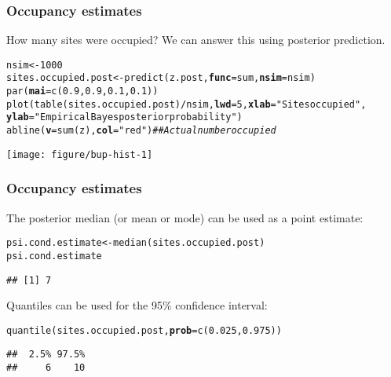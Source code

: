 \documentclass[color=usenames,dvipsnames,handout]{beamer}\usepackage[]{graphicx}\usepackage[]{xcolor}
\makeatletter
\newcommand{\hlnum}[1]{\textcolor[rgb]{0.69,0.494,0}{#1}}%
\newcommand{\hlsng}[1]{\textcolor[rgb]{0.749,0.012,0.012}{#1}}%
\newcommand{\hlcom}[1]{\textcolor[rgb]{0.514,0.506,0.514}{\textit{#1}}}%
\newcommand{\hlopt}[1]{\textcolor[rgb]{0,0,0}{#1}}%
\newcommand{\hldef}[1]{\textcolor[rgb]{0,0,0}{#1}}%
\newcommand{\hlkwb}[1]{\textcolor[rgb]{0,0.341,0.682}{#1}}%
\newcommand{\hlkwc}[1]{\textcolor[rgb]{0,0,0}{\textbf{#1}}}%
\newcommand{\hlkwd}[1]{\textcolor[rgb]{0.004,0.004,0.506}{#1}}%
\newenvironment{kframe}{%
 \def\at@end@of@kframe{}%
 \ifinner\ifhmode%
  \def\at@end@of@kframe{\end{minipage}}%
  \begin{minipage}{\columnwidth}%
 \fi\fi%
 \def\FrameCommand##1{\hskip\@totalleftmargin \hskip-\fboxsep
 \colorbox{shadecolor}{##1}\hskip-\fboxsep
     \hskip-\linewidth \hskip-\@totalleftmargin \hskip\columnwidth}%
 \MakeFramed {\advance\hsize-\width
   \@totalleftmargin\z@ \linewidth\hsize
   \@setminipage}}%
 {\par\unskip\endMakeFramed%
 \at@end@of@kframe}
\newenvironment{knitrout}{}{} %
\makeatother
\begin{document}
\begin{frame}[fragile]
  \frametitle{Occupancy estimates}
  How many sites were occupied? \pause
  We can answer this using posterior prediction.
\begin{knitrout}\tiny
{}\color{fgcolor}\begin{kframe}
\begin{alltt}
\hldef{nsim} \hlkwb{<-} \hlnum{1000}
\hldef{sites.occupied.post} \hlkwb{<-} \hlkwd{predict}\hldef{(z.post,} \hlkwc{func}\hldef{=sum,} \hlkwc{nsim}\hldef{=nsim)}
\hlkwd{par}\hldef{(}\hlkwc{mai}\hldef{=}\hlkwd{c}\hldef{(}\hlnum{0.9}\hldef{,}\hlnum{0.9}\hldef{,}\hlnum{0.1}\hldef{,}\hlnum{0.1}\hldef{))}
\hlkwd{plot}\hldef{(}\hlkwd{table}\hldef{(sites.occupied.post)}\hlopt{/}\hldef{nsim,} \hlkwc{lwd}\hldef{=}\hlnum{5}\hldef{,} \hlkwc{xlab}\hldef{=}\hlsng{"Sites occupied"}\hldef{,}
    \hlkwc{ylab}\hldef{=}\hlsng{"Empirical Bayes posterior probability"}\hldef{)}
\hlkwd{abline}\hldef{(}\hlkwc{v}\hldef{=}\hlkwd{sum}\hldef{(z),} \hlkwc{col}\hldef{=}\hlsng{"red"}\hldef{)} \hlcom{## Actual number occupied}
\end{alltt}
\end{kframe}

{\centering \texttt{[image: figure/bup-hist-1]} 

}


\end{knitrout}
\end{frame}



\begin{frame}[fragile]
  \frametitle{Occupancy estimates}
  The posterior median (or mean or mode) can be used as a point estimate:
\begin{knitrout}
\color{fgcolor}\begin{kframe}
\begin{alltt}
\hldef{psi.cond.estimate} \hlkwb{<-} \hlkwd{median}\hldef{(sites.occupied.post)}
\hldef{psi.cond.estimate}
\end{alltt}
\begin{verbatim}
## [1] 7
\end{verbatim}
\end{kframe}
\end{knitrout}

\pause
\vfill
Quantiles can be used for the 95\% confidence interval:
\begin{knitrout}
\color{fgcolor}\begin{kframe}
\begin{alltt}
\hlkwd{quantile}\hldef{(sites.occupied.post,} \hlkwc{prob}\hldef{=}\hlkwd{c}\hldef{(}\hlnum{0.025}\hldef{,} \hlnum{0.975}\hldef{))}
\end{alltt}
\begin{verbatim}
##  2.5% 97.5% 
##     6    10
\end{verbatim}
\end{kframe}
\end{knitrout}
\end{frame}
\end{document}

